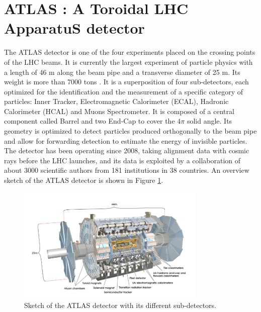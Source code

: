 \section{ATLAS : A Toroidal LHC ApparatuS detector}
\label{chap2:ATLAS}
The ATLAS detector is one of the four experiments placed on the crossing points of the LHC beams. It is currently the largest experiment of particle physics with a length of 46 m along the beam pipe and a transverse diameter of 25 m. Its weight is more than 7000 tons \cite{ATLAS_Exp}. It is a superposition of four sub-detectors, each optimized for the identification and the measurement of a specific category of particles: Inner Tracker, Electromagnetic Calorimeter (ECAL), Hadronic Calorimeter (HCAL) and Muons Spectrometer. It is composed of a central component called Barrel and two End-Cap to cover the $4\pi$ solid angle. Its geometry is optimized to detect particles produced orthogonally to the beam pipe and allow for forwarding detection to estimate the energy of invisible particles. The detector has been operating since 2008, taking alignment data with cosmic rays before the LHC launches, and its data is exploited by a collaboration of about 3000 scientific authors from 181 institutions in 38 countries. An overview sketch of the ATLAS detector is shown in Figure \ref{fig:chap2:ATLAS:Img}.
\begin{figure}[htbp]
    \centering
    \includegraphics[width=0.8\textwidth]{Ch2/Img/ATLAS_sketch.png}
    \caption{Sketch of the ATLAS detector with its different sub-detectors.}
    \label{fig:chap2:ATLAS:Img}
\end{figure}


